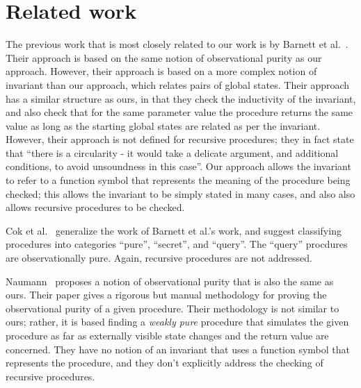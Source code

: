 \section{Related work}\label{sec:related}

The previous work that is most closely related to our work is by Barnett et
al.~\cite{barnett200499,barnett2006allowing}. Their approach is based on
the same notion of observational purity as our approach. However, their
approach is based on a more complex notion of invariant than our approach,
which relates pairs of global states. Their approach has a similar
structure as ours, in that they check the inductivity of the invariant, and
also check that for the same parameter value the procedure returns the same
value as long as the starting global states are related as per the
invariant. However, their approach is not defined for recursive procedures;
they in fact state that  ``there is a circularity - it would
take a delicate argument, and additional conditions, to avoid unsoundness
in this case''. Our approach allows the invariant to refer to a function
symbol that represents the meaning of the procedure being checked; this
allows the invariant to be simply stated in many cases, and also also
allows recursive procedures to be checked. 

Cok et al.~\cite{cok2008extensions}  generalize the work of Barnett
et al.'s work, and suggest classifying procedures into categories ``pure'',
``secret'', and ``query''. The ``query'' procdures are observationally
pure. Again, recursive procedures are not addressed.

Naumann~\cite{naumann2007observational} proposes a notion of observational
purity that is also the same as ours. Their paper gives a rigorous but manual
methodology for proving the observational purity of a
given procedure. Their methodology is not similar to ours; rather, it is
based finding a \emph{weakly pure} procedure that simulates the given
procedure as far as externally visible state changes and the return value
are concerned. They have no notion of an invariant that uses a function
symbol that represents the procedure, and they don't explicitly address the
checking of recursive procedures.

